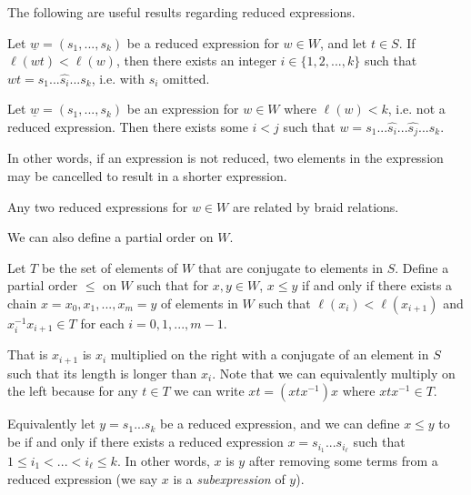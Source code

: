 The following are useful results regarding reduced expressions. %

\begin{theorem}
    Let $\underline{w} = (s_1, ..., s_k)$ be a reduced expression for $w \in W$, and let $t \in S$. If $\ell(wt) < \ell(w)$, then there exists an integer $i \in \{1,2,...,k\}$ such that $wt = s_1 ... \hat{s_i} ... s_k$, i.e. with $s_i$ omitted.
\end{theorem}


\begin{corollary}
    Let $\underline{w} = (s_1, ..., s_k)$ be an expression for $w \in W$ where $\ell(w) < k$, i.e. not a reduced expression. Then there exists some $i < j$ such that $w = s_1 ... \hat{s_i} ... \hat{s_j} ... s_k$.
\end{corollary}

In other words, if an expression is not reduced, two elements in the expression may be cancelled to result in a shorter expression.


\begin{theorem}[Matsumoto, 1964]\label{thm-matsumoto}
    Any two reduced expressions for $w \in W$ are related by braid relations.
\end{theorem}


We can also define a partial order on $W$.

\begin{definition}
    Let $T$ be the set of elements of $W$ that are conjugate to elements in $S$. Define a partial order $\leq$ on $W$ such that for $x,y \in W$, $x \leq y$ if and only if there exists a chain $x=x_0,x_1,...,x_m=y$ of elements in $W$ such that $\ell(x_i) < \ell(x_{i+1})$ and $x_i^{-1} x_{i+1} \in T$ for each $i = 0,1,...,m-1$.
\end{definition}

That is $x_{i+1}$ is $x_i$ multiplied on the right with a conjugate of an element in $S$ such that its length is longer than $x_i$. Note that we can equivalently multiply on the left because for any $t \in T$ we can write $xt = (xtx^{-1})x$ where $xtx^{-1} \in T$.


Equivalently let $y = s_1 ... s_k$ be a reduced expression, and we can define $x \leq y$ to be if and only if there exists a reduced expression $x = s_{i_1} ... s_{i_\ell}$ such that $1 \leq i_1 < ... < i_\ell \leq k$. In other words, $x$ is $y$ after removing some terms from a reduced expression (we say $x$ is a \textit{subexpression} of $y$).

